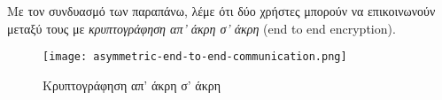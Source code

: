 Με τον συνδυασμό των παραπάνω, λέμε ότι δύο χρήστες μπορούν να επικοινωνούν μεταξύ τους με \textit{κρυπτογράφηση απ' άκρη σ' άκρη} (end to end encryption).

\begin{figure}[H]
	\centering
	\texttt{[image: asymmetric-end-to-end-communication.png]}
	\caption{Κρυπτογράφηση απ' άκρη σ' άκρη}
\end{figure}

